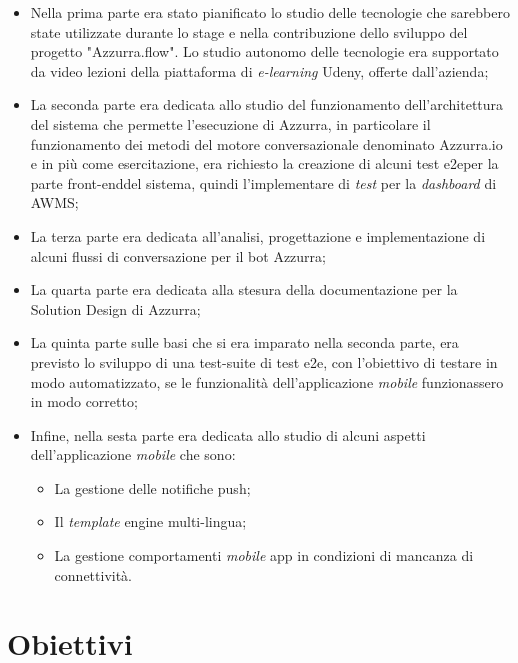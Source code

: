 \begin{itemize}
	\item Nella prima parte era stato pianificato lo studio delle tecnologie che sarebbero state utilizzate durante lo stage e nella contribuzione dello sviluppo del progetto "Azzurra.flow". Lo studio autonomo delle tecnologie era supportato da video lezioni della piattaforma di \emph{e-learning} Udeny, offerte dall'azienda;
	\item La seconda parte era dedicata allo studio del funzionamento dell'\gls{architettura}\ap{[g]} del sistema che permette l'esecuzione di Azzurra, in particolare il funzionamento dei metodi del motore conversazionale denominato Azzurra.io e in più come esercitazione, era richiesto la creazione di alcuni \gls{test e2e}\glsfirstoccur per la parte \gls{front-end}\glsfirstoccur del sistema, quindi l'implementare di \emph{test} per la \emph{dashboard} di \gls{AWMS};
	\item La terza parte era dedicata all'analisi, progettazione e implementazione di alcuni flussi di conversazione per il \gls{bot}\ap{[g]} Azzurra;
	\item La quarta parte era dedicata alla stesura della documentazione per la Solution Design di Azzurra;
	\item La quinta parte sulle basi che si era imparato nella seconda parte, era previsto lo sviluppo di una test-suite di \gls{test e2e}\ap{[g]}, con l'obiettivo di testare in modo automatizzato, se le funzionalità dell'applicazione \emph{mobile} funzionassero in modo corretto;
	\item Infine, nella sesta parte era dedicata allo studio di alcuni aspetti dell'applicazione \emph{mobile} che sono:
		\begin{itemize}
			\item La gestione delle notifiche push;
			\item Il \emph{template} engine multi-lingua;
			\item La gestione comportamenti \emph{mobile} app in condizioni di mancanza di connettività.
		\end{itemize}
\end{itemize}



\section{Obiettivi}

